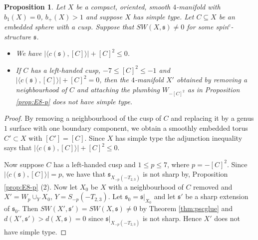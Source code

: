 \documentclass{amsart}
\newtheorem{proposition}[theorem]{Proposition}
\theoremstyle{definition}
\theoremstyle{remark}
\numberwithin{equation}{section}
\begin{document}
\begin{proposition}\label{prop:lcusp}
Let $X$ be a compact, oriented, smooth $4$-manifold with $b_1(X) = 0$, $b_+(X) > 1$ and suppose $X$ has simple type. Let $C \subseteq X$ be an embedded sphere with a cusp. Suppose that $SW(X , \mathfrak{s}) \neq 0$ for some spin$^c$-structure $\mathfrak{s}$.
\begin{itemize}
\item[(1)]{We have $| \langle c(\mathfrak{s}) , [C] \rangle | + [C]^2 \le 0$.}
\item[(2)]{If $C$ has a left-handed cusp, $-7 \le [C]^2 \le -1$ and $| \langle c(\mathfrak{s}) , [C] \rangle | + [C]^2 = 0$, then the $4$-manifold $X'$ obtained by removing a neighbourhood of $C$ and attaching the plumbing $W_{-[C]^2}$ as in Proposition \ref{prop:E8-p} does not have simple type.}
\end{itemize}

\end{proposition}
\begin{proof}
By removing a neighbourhood of the cusp of $C$ and replacing it by a genus $1$ surface with one boundary component, we obtain a smoothly embedded torus $C' \subset X$ with $[C'] = [C]$. Since $X$ has simple type the adjunction inequality says that $| \langle c(\mathfrak{s}) , [C] \rangle | + [C]^2 \le 0$.

Now suppose $C$ has a left-handed cusp and $1 \le p \le 7$, where $p = -[C]^2$. Since $| \langle c(\mathfrak{s}) , [C] \rangle | = p$, we have that $\mathfrak{s}_{X_{-p}(-T_{2,3})}$ is not sharp by, Proposition \ref{prop:E8-p} (2). Now let $X_0$ be $X$ with a neighbourhood of $C$ removed and $X' = W_p \cup_Y X_0$, $Y = S_{-p}(-T_{2,3})$. Let $\mathfrak{s}_0 = \mathfrak{s}|_{X_0}$ and let $\mathfrak{s}'$ be a sharp extension of $\mathfrak{s}_0$. Then $SW(X' , \mathfrak{s}') = SW(X , \mathfrak{s}) \neq 0$ by Theorem \ref{thm:pscglue} and $d(X' , \mathfrak{s}') > d(X , \mathfrak{s}) = 0$ since $\mathfrak{s}|_{X_{-p}(-T_{2,3})}$ is not sharp. Hence $X'$ does not have simple type.
\end{proof}
\end{document}
